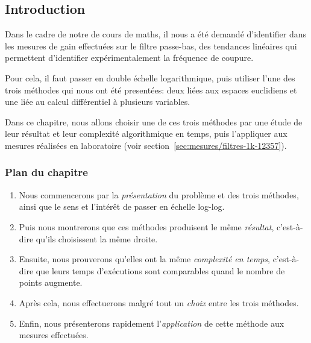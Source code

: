 \subsection*{Introduction}

Dans le cadre de notre de cours de maths,
il nous a été demandé d'identifier dans les mesures de gain effectuées
sur le filtre passe-bas,
des tendances linéaires qui permettent d'identifier expérimentalement
la fréquence de coupure.

Pour cela, il faut passer en double échelle logarithmique,
puis utiliser l'une des trois méthodes qui nous ont été presentées:
deux liées aux espaces euclidiens et une liée au calcul différentiel
à plusieurs variables.

Dans ce chapitre, nous allons choisir une de ces trois méthodes
par une étude de leur résultat et leur complexité algorithmique en temps,
puis l'appliquer aux mesures réalisées en laboratoire
(voir section~\ref{sec:mesures/filtres-1k-12357}).

\subsubsection*{Plan du chapitre}
\begin{enumerate}
    \item Nous commencerons par la \emph{présentation} du problème et
        des trois méthodes,
        ainsi que le sens et l'intérêt de passer en échelle log-log.
    \item Puis nous montrerons que ces méthodes produisent
        le même \emph{résultat},
        c'est-à-dire qu'ils choisissent la même droite.
    \item Ensuite, nous prouverons qu'elles ont la même \emph{complexité
        en temps}, c'est-à-dire que leurs temps d'exécutions sont comparables
        quand le nombre de points augmente.
    \item Après cela, nous effectuerons malgré tout un \emph{choix}
        entre les trois méthodes.
    \item Enfin, nous présenterons rapidement l'\emph{application}
        de cette méthode aux mesures effectuées.
\end{enumerate}
